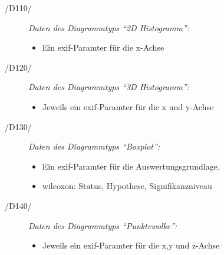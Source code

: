 \begin{description}

	\item[/D110/] \textit{Daten des Diagrammtyps "`2D Histogramm"':}
	\begin{itemize}
		\item Ein \gls{exif}-Paramter für die x-Achse
	\end{itemize}
				
	\item[/D120/] \textit{Daten des Diagrammtyps "`3D Histogramm"':}
		\begin{itemize}
		\item Jeweils ein \gls{exif}-Paramter für die x und y-Achse
	\end{itemize}
	
	\item[/D130/] \textit{Daten des Diagrammtyps "`Boxplot"':}
		\begin{itemize}
		\item Ein \gls{exif}-Paramter für die Auswertungsgrundlage.
		\item \gls{wilcoxon}: Status, Hypothese, Signifikanzniveau
	\end{itemize}
	
	\item[/D140/] \textit{Daten des Diagrammtyps "`Punktewolke"':}
		\begin{itemize}
		\item Jeweils ein \gls{exif}-Paramter für die x,y und z-Achse
	\end{itemize}

\end{description}